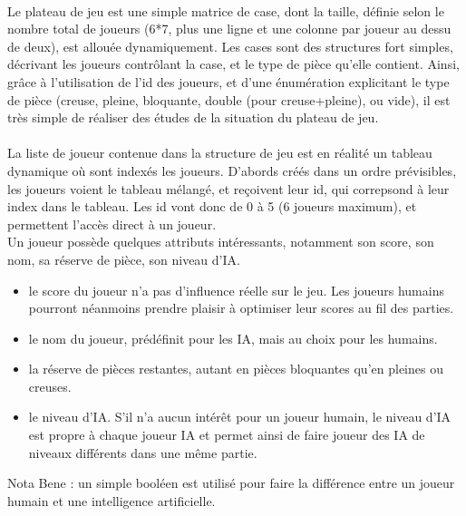 \documentclass{report}
\begin{document}
        \paragraph*{} %
        Le plateau de jeu est une simple matrice de case, dont la taille, définie selon le nombre total de joueurs (6*7, plus une ligne et une colonne par joueur au dessu de deux), 
        est allouée dynamiquement. Les cases sont des structures fort simples, décrivant les joueurs contrôlant la case, et le type de pièce qu'elle contient.
        Ainsi, grâce à l'utilisation de l'id des joueurs, et d'une énumération explicitant le type de pièce (creuse, pleine, bloquante, double (pour creuse+pleine), ou vide), il est très
        simple de réaliser des études de la situation du plateau de jeu.

        \paragraph*{} %
        La liste de joueur contenue dans la structure de jeu est en réalité un tableau dynamique où sont indexés les joueurs. D'abords créés dans un ordre prévisibles, les joueurs voient
        le tableau mélangé, et reçoivent leur id, qui correpsond à leur index dans le tableau. Les id vont donc de 0 à 5 (6 joueurs maximum), et permettent l'accès direct à un joueur.\\
        Un joueur possède quelques attributs intéressants, notamment son score, son nom, sa réserve de pièce, son niveau d'IA.
        \begin{itemize} %
            \item le score du joueur n'a pas d'influence réelle sur le jeu. Les joueurs humains pourront néanmoins prendre plaisir à optimiser leur scores au fil des parties.
            \item le nom du joueur, prédéfinit pour les IA, mais au choix pour les humains.
            \item la réserve de pièces restantes, autant en pièces bloquantes qu'en pleines ou creuses. 
            \item le niveau d'IA. S'il n'a aucun intérêt pour un joueur humain, le niveau d'IA est propre à chaque joueur IA et permet ainsi de faire joueur des IA de niveaux différents
                dans une même partie.
        \end{itemize} 
        Nota Bene : un simple booléen est utilisé pour faire la différence entre un joueur humain et une intelligence artificielle.
\end{document}
